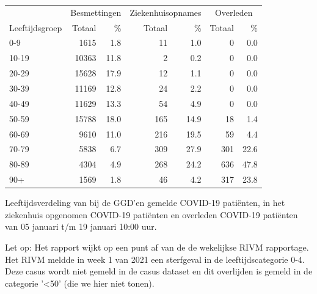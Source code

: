 \documentclass[
  english,
  man,floatsintext]{apa6}
\begin{document}
\begin{table}[H]
\centering\begingroup\fontsize{11}{13}\selectfont

\begin{threeparttable}
\begin{tabular}{lrrrrrr}
\toprule
\multicolumn{1}{c}{ } & \multicolumn{2}{c}{Besmettingen} & \multicolumn{2}{c}{Ziekenhuisopnames} & \multicolumn{2}{c}{Overleden} \\
\cmidrule(l{3pt}r{3pt}){2-3} \cmidrule(l{3pt}r{3pt}){4-5} \cmidrule(l{3pt}r{3pt}){6-7}
Leeftijdsgroep & Totaal & \% & Totaal & \% & Totaal & \%\\
\midrule
0-9 & 1615 & 1.8 & 11 & 1.0 & 0 & 0.0\\
10-19 & 10363 & 11.8 & 2 & 0.2 & 0 & 0.0\\
20-29 & 15628 & 17.9 & 12 & 1.1 & 0 & 0.0\\
30-39 & 11169 & 12.8 & 24 & 2.2 & 0 & 0.0\\
40-49 & 11629 & 13.3 & 54 & 4.9 & 0 & 0.0\\
50-59 & 15788 & 18.0 & 165 & 14.9 & 18 & 1.4\\
60-69 & 9610 & 11.0 & 216 & 19.5 & 59 & 4.4\\
70-79 & 5838 & 6.7 & 309 & 27.9 & 301 & 22.6\\
80-89 & 4304 & 4.9 & 268 & 24.2 & 636 & 47.8\\
90+ & 1569 & 1.8 & 46 & 4.2 & 317 & 23.8\\
\bottomrule
\end{tabular}
\begin{tablenotes}
\item[1] Leeftijdsverdeling van bij de GGD’en gemelde COVID-19 patiënten, in het ziekenhuis opgenomen COVID-19 patiënten en overleden COVID-19 patiënten van 05 januari t/m 19 januari 10:00 uur.
\item[2] Let op: Het rapport wijkt op een punt af van de de wekelijkse RIVM rapportage. Het RIVM meldde in week 1 van 2021 een sterfgeval in de leeftijdscategorie 0-4. Deze casus wordt niet gemeld in de casus dataset en dit overlijden is gemeld in de categorie '<50' (die we hier niet tonen).
\end{tablenotes}
\end{threeparttable}
\endgroup{}
\end{table}

\newpage
\end{document}
